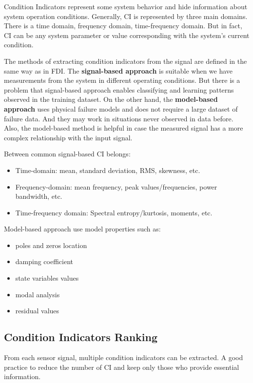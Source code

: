 Condition Indicators represent some system behavior and hide information
about system operation conditions.  Generally, CI is represented by three
main domains. There is a time domain, frequency domain, time-frequency
domain. But in fact, CI can be any system parameter or value corresponding
with the system's current condition.

The methods of extracting condition indicators from the signal are defined
in the same way as in FDI.  The \textbf{signal-based approach} is suitable
when we have measurements from the system in different operating
conditions.  But there is a problem that signal-based approach enables
classifying and learning patterns observed in the training dataset.  On the
other hand, the \textbf{model-based approach} uses physical failure models
and does not require a large dataset of failure data. And they may work in
situations never observed in data before. Also, the model-based method is
helpful in case the measured signal has a more complex relationship with
the input signal.

Between common signal-based CI belongs:
\begin{itemize}
    \item Time-domain: mean, standard deviation, RMS, skewness, etc. 
    \item Frequency-domain: mean frequency, peak values/frequencies, power
        bandwidth, etc. 
    \item Time-frequency domain: Spectral entropy/kurtosis, moments, etc. 
\end{itemize}

Model-based approach use model properties such as:
\begin{itemize}
    \item poles and zeros location
    \item damping coefficient
    \item state variables values
    \item modal analysis
    \item residual values
\end{itemize}

\subsection{Condition Indicators Ranking}\label{sec:ci_ranking}

From each sensor signal, multiple condition indicators can be extracted.  A
good practice to reduce the number of CI and keep only those who provide
essential information. 


